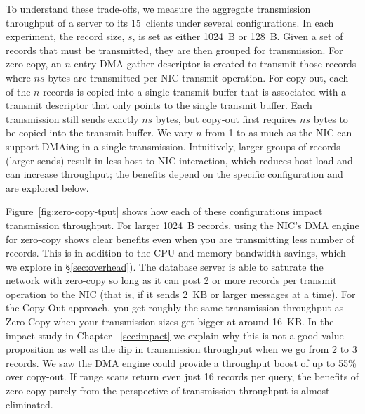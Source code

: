 To understand these trade-offs, we measure the aggregate transmission
throughput of a server to its 15~clients under several
configurations.  In each experiment, the record size, $s$, is set as either 1024~B or
128~B. Given a set of records that must be transmitted, they are then grouped
for transmission. For zero-copy, an $n$ entry DMA gather descriptor is created
to transmit those records where $ns$ bytes are transmitted per NIC transmit
operation. For copy-out, each of the $n$ records is copied into a single
transmit buffer that is associated with a transmit descriptor that only points
to the single transmit buffer. Each transmission still sends exactly $ns$
bytes, but copy-out first requires $ns$ bytes to be copied into the transmit buffer.
We vary $n$ from 1 to as much as the NIC can support DMAing in a single transmission.
Intuitively, larger groups of records (larger sends) result in less host-to-NIC
interaction, which reduces host load and can increase throughput; the benefits
depend on the specific configuration and are explored below.


Figure~\ref{fig:zero-copy-tput} shows how each of these configurations impact
transmission throughput. For larger 1024~B records, using the NIC's DMA engine
for zero-copy shows clear benefits even when you are transmitting less number of 
records. This is in addition to the CPU and memory bandwidth savings, which 
we explore in \S\ref{sec:overhead}). The database server is able
to saturate the network with zero-copy so long as it can post 2 or more
records per transmit operation to the NIC (that is, if it sends 2~KB or larger
messages at a time). For the Copy Out approach, you get roughly the same transmission 
throughput as Zero Copy when your transmission sizes get bigger at around 16~KB. In 
the impact study in Chapter ~\ref{sec:impact} we explain why this is not a good value 
proposition as well as the dip in transmission throughput when we go from 2 to 3 records.
We saw the DMA engine could provide a throughput boost
of up to 55\% over copy-out. If range scans return even just 16 records per query, the
benefits of zero-copy purely from the perspective of transmission throughput is almost eliminated.

